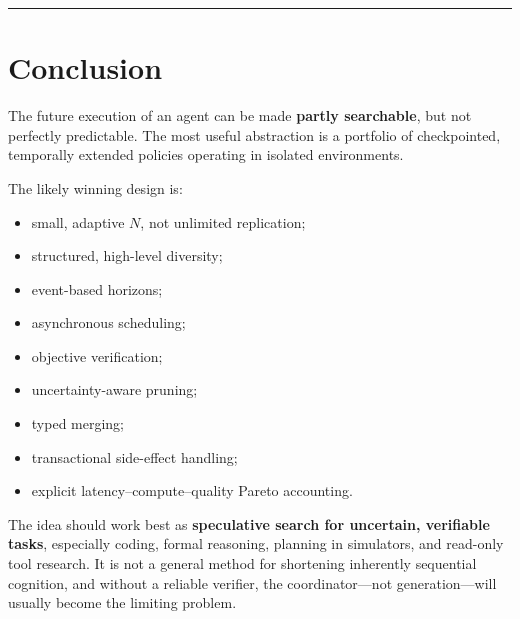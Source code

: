 \documentclass[
  letterpaper,
]{article}
\providecommand{\tightlist}{%
  \setlength{\itemsep}{0pt}\setlength{\parskip}{0pt}}
\begin{document}
\begin{center}\rule{0.5\linewidth}{0.5pt}\end{center}

\section{Conclusion}\label{conclusion}

The future execution of an agent can be made \textbf{partly searchable}, but not perfectly predictable. The most useful abstraction is a portfolio of checkpointed, temporally extended policies operating in isolated environments.

The likely winning design is:

\begin{itemize}
\tightlist
\item
  small, adaptive \(N\), not unlimited replication;
\item
  structured, high-level diversity;
\item
  event-based horizons;
\item
  asynchronous scheduling;
\item
  objective verification;
\item
  uncertainty-aware pruning;
\item
  typed merging;
\item
  transactional side-effect handling;
\item
  explicit latency--compute--quality Pareto accounting.
\end{itemize}

The idea should work best as \textbf{speculative search for uncertain, verifiable tasks}, especially coding, formal reasoning, planning in simulators, and read-only tool research. It is not a general method for shortening inherently sequential cognition, and without a reliable verifier, the coordinator---not generation---will usually become the limiting problem.
\end{document}
